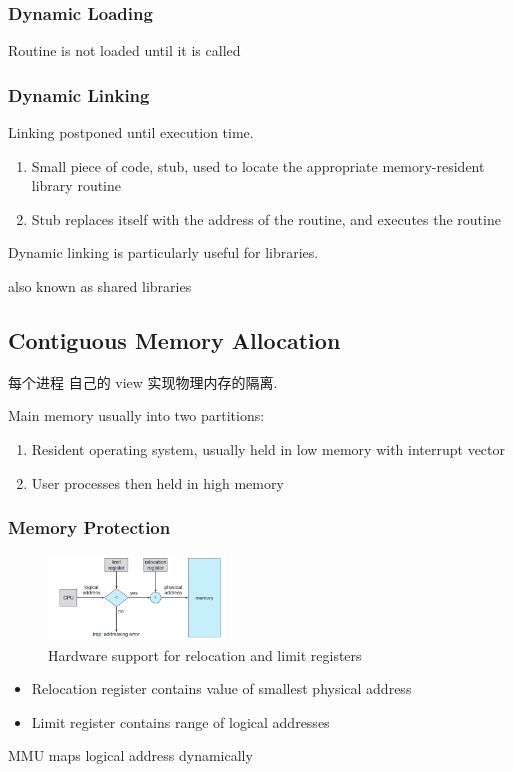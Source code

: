\subsubsection{Dynamic Loading}
Routine is not loaded until it is called

\subsubsection{Dynamic Linking}
Linking postponed until execution time. 
\begin{enumerate}
    \item Small piece of code, stub, used to locate the
    appropriate memory-resident library routine
    \item Stub replaces itself with the address of the routine,
    and executes the routine
\end{enumerate}
Dynamic linking is particularly useful for libraries. 


also known as shared libraries

\subsection{Contiguous Memory Allocation}
每个进程 自己的 view 实现物理内存的隔离. 

Main memory usually into two partitions:
\begin{enumerate}
    \item Resident operating system, usually held in low memory with
    interrupt vector
    \item User processes then held in high memory
\end{enumerate}

\subsubsection{Memory Protection}

\begin{figure}[!htb]
    \centering
    \includegraphics[width=0.42\textwidth]{pic/OS8/Hardware support for relocation and limit registers}
    \caption{Hardware support for relocation and limit registers}
\end{figure}
\begin{itemize}
    \item Relocation register contains value of smallest physical
    address
    \item Limit register contains range of logical addresses
\end{itemize}
MMU maps logical address dynamically


